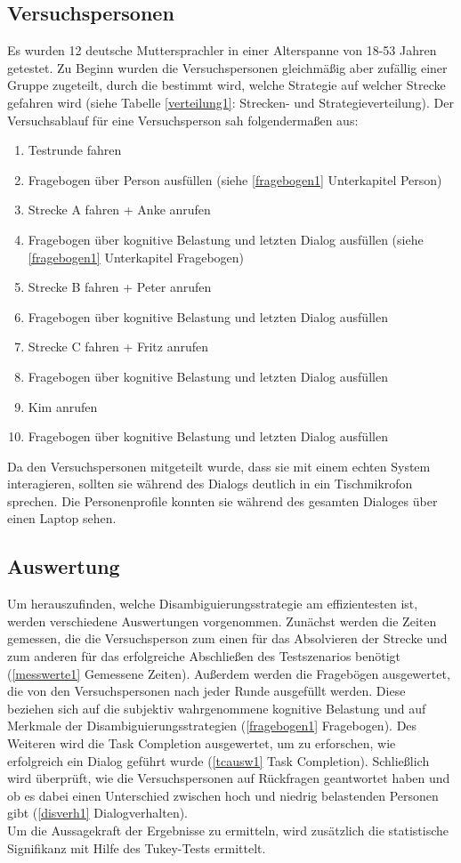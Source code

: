 \documentclass[12pt,a4paper]{scrartcl}
\begin{document}
\subsection{Versuchspersonen}
Es wurden 12 deutsche Muttersprachler in einer Alterspanne von 18-53 Jahren getestet. Zu Beginn wurden die Versuchspersonen gleichmäßig aber zufällig einer Gruppe zugeteilt, durch die bestimmt wird, welche Strategie auf welcher Strecke gefahren wird (siehe Tabelle \ref{verteilung1}: Strecken- und Strategieverteilung).
Der Versuchsablauf für eine Versuchsperson sah folgendermaßen aus:
\begin{enumerate}
\item Testrunde fahren
\item Fragebogen über Person ausfüllen (siehe \ref{fragebogen1} Unterkapitel Person)
\item Strecke A fahren + Anke anrufen
\item Fragebogen über kognitive Belastung und letzten Dialog ausfüllen (siehe \ref{fragebogen1} Unterkapitel Fragebogen)
\item Strecke B fahren + Peter anrufen
\item Fragebogen über kognitive Belastung und letzten Dialog ausfüllen
\item Strecke C fahren + Fritz anrufen
\item Fragebogen über kognitive Belastung und letzten Dialog ausfüllen 
\item Kim anrufen
\item Fragebogen über kognitive Belastung und letzten Dialog ausfüllen 
\end{enumerate}

Da den Versuchspersonen mitgeteilt wurde, dass sie mit einem echten System interagieren, sollten sie während des Dialogs deutlich in ein Tischmikrofon sprechen. Die Personenprofile konnten sie während des gesamten Dialoges über einen Laptop sehen.

\subsection{Auswertung}
\label{auswertung1}
Um herauszufinden, welche Disambiguierungsstrategie am effizientesten ist, werden verschiedene Auswertungen vorgenommen. 
Zunächst werden die Zeiten gemessen, die die Versuchsperson zum einen für das Absolvieren der Strecke und zum anderen für das erfolgreiche Abschließen des Testszenarios benötigt (\ref{messwerte1} Gemessene Zeiten).
Außerdem werden die Fragebögen ausgewertet, die von den Versuchspersonen nach jeder Runde ausgefüllt werden. Diese beziehen sich auf die subjektiv wahrgenommene kognitive Belastung und auf Merkmale der Disambiguierungsstrategien (\ref{fragebogen1} Fragebogen). Des Weiteren wird die Task Completion ausgewertet, um zu erforschen, wie erfolgreich ein Dialog geführt wurde (\ref{tcausw1} Task Completion). Schließlich wird überprüft, wie die Versuchspersonen auf Rückfragen geantwortet haben und ob es dabei einen Unterschied zwischen hoch und niedrig belastenden Personen gibt (\ref{disverh1} Dialogverhalten). \\
Um die Aussagekraft der Ergebnisse zu ermitteln, wird zusätzlich die statistische Signifikanz mit Hilfe des Tukey-Tests ermittelt. 
\end{document}
